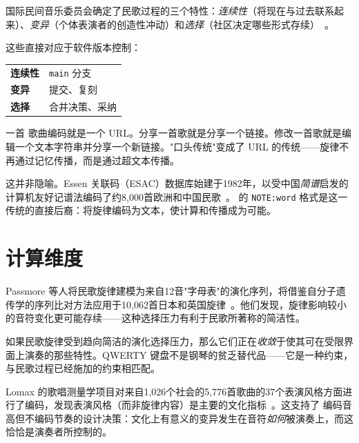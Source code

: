 \documentclass[11pt]{article}
\begin{document}
国际民间音乐委员会确定了民歌过程的三个特性：\emph{连续性}（将现在与过去联系起来）、\emph{变异}（个体表演者的创造性冲动）和\emph{选择}（社区决定哪些形式存续）~\citep{karpeles1955definition}。

\begin{accentcard}
这些直接对应于软件版本控制：

\vspace{0.3em}
\begin{tabularx}{\linewidth}{lX}
\textbf{连续性} & \texttt{main} 分支 \\
\textbf{变异} & 提交、复刻 \\
\textbf{选择} & 合并决策、采纳 \\
\end{tabularx}
\end{accentcard}

一首 \np{} 歌曲编码就是一个 URL。分享一首歌就是分享一个链接。修改一首歌就是编辑一个文本字符串并分享一个新链接。"口头传统"变成了 URL 的传统——旋律不再通过记忆传播，而是通过超文本传播。

这并非隐喻。Essen 关联码（ESAC）数据库始建于1982年，以受中国\textit{简谱}启发的计算机友好记谱法编码了约8,000首欧洲和中国民歌~\citep{schaffrath1995esac}。\np{} 的 \texttt{NOTE:word} 格式是这一传统的直接后裔：将旋律编码为文本，使计算和传播成为可能。

\section{计算维度}

Passmore 等人将民歌旋律建模为来自12音"字母表"的演化序列，将借鉴自分子遗传学的序列比对方法应用于10,062首日本和英国旋律~\citep{passmore2023cultural}。他们发现，旋律影响较小的音符变化更可能存续——这种选择压力有利于民歌所著称的简洁性。

\begin{card}

如果民歌旋律受到趋向简洁的演化选择压力，那么它们正在\emph{收敛}于使其可在受限界面上演奏的那些特性。QWERTY 键盘不是钢琴的贫乏替代品——它是一种约束，与民歌过程已经施加的约束相匹配。
\end{card}

Lomax 的歌唱测量学项目对来自1,026个社会的5,776首歌曲的37个表演风格方面进行了编码，发现表演风格（而非旋律内容）是主要的文化指标~\citep{lomax1968folk}。这支持了 \np{} 编码音高但不编码节奏的设计决策：文化上有意义的变异发生在音符\emph{如何}被演奏上，而这恰恰是演奏者所控制的。
\end{document}

